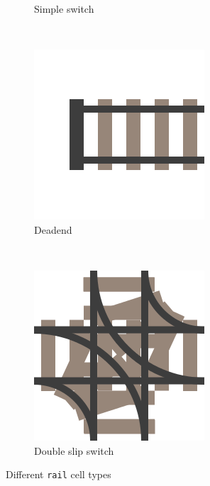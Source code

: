 \documentclass[a4paper,10pt]{report}
\begin{document}
\begin{figure}[h]
\begin{subfigure}[t]{.25\linewidth}
		\caption{Simple switch}
		\label{fig:rail-cells-simple}
	\end{subfigure}%
	~ 
	\begin{subfigure}[t]{.25\linewidth}
		\includegraphics[width=\textwidth]{deadend-rail.png}
		\caption{Deadend}
		\label{fig:rail-cells-deadend}
	\end{subfigure}%
	~
	\begin{subfigure}[t]{.25\linewidth}
		\includegraphics[width=\textwidth]{double-slip-rail.png}
		\caption{Double slip switch}
		\label{fig:rail-cells-double}
	\end{subfigure}%
    
	\caption{Different \texttt{rail} cell types}
	\label{fig:rail-cells}
\end{figure}
\end{document}
